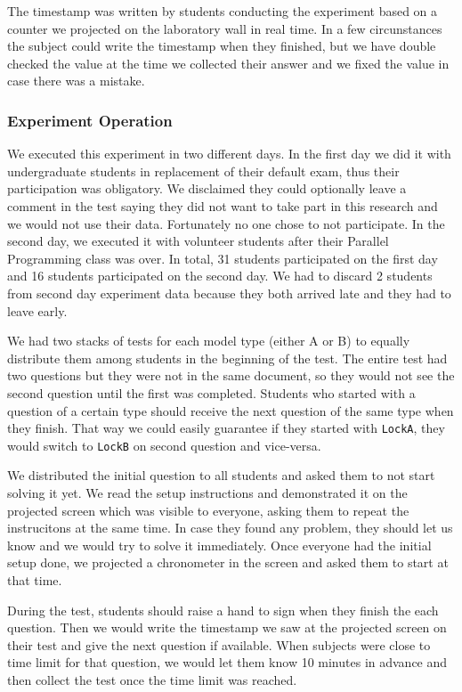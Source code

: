The timestamp was written by students conducting the experiment based on a counter we projected on the laboratory wall in real time.
In a few circunstances the subject could write the timestamp when they finished, but we have double checked the value at the time we collected their answer
and we fixed the value in case there was a mistake.

\subsubsection{Experiment Operation}

We executed this experiment in two different days.
In the first day we did it with undergraduate students in replacement of their default exam, thus their participation was obligatory.
We disclaimed they could optionally leave a comment in the test saying they did not want to take part in this research and we would not use their data.
Fortunately no one chose to not participate.
In the second day, we executed it with volunteer students after their Parallel Programming class was over.
In total, 31 students participated on the first day and 16 students participated on the second day.
We had to discard 2 students from second day experiment data because they both arrived late and they had to leave early.

We had two stacks of tests for each model type (either A or B) to equally distribute them among students in the beginning of the test.
The entire test had two questions but they were not in the same document, so they would not see the second question until the first was completed.
Students who started with a question of a certain type should receive the next question of the same type when they finish.
That way we could easily guarantee if they started with {\tt LockA}, they would switch to {\tt LockB} on second question and vice-versa.

We distributed the initial question to all students and asked them to not start solving it yet.
We read the setup instructions and demonstrated it on the projected screen which was visible to everyone,
asking them to repeat the instrucitons at the same time.
In case they found any problem, they should let us know and we would try to solve it immediately.
Once everyone had the initial setup done, we projected a chronometer in the screen and asked them to start at that time.

During the test, students should raise a hand to sign when they finish the each question.
Then we would write the timestamp we saw at the projected screen on their test and give the next question if available.
When subjects were close to time limit for that question,
we would let them know 10 minutes in advance and then collect the test once the time limit was reached.

